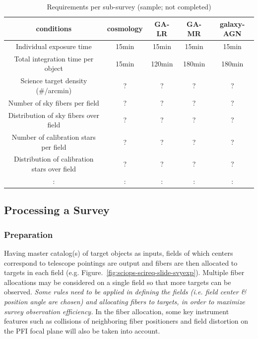 \documentclass[a4paper,notitlepage]{article}
\begin{document}
\begin{table}[htb]
\caption{Requirements per sub-survey (sample; not completed)}
\label{tab:sciops-scireq-subsvy}
\begin{center}
\begin{tabular}{c|c|c|c|c}
conditions & cosmology & GA-LR & GA-MR & galaxy-AGN \\ \hline
\hline
Individual exposure time & 15min & 15min & 15min & 15min \\
\hline
Total integration time per object & 15min & 120min & 180min & 180min \\
\hline
Science target density (\#/arcmin) & ? & ? & ? & ? \\
\hline
Number of sky fibers per field & ? & ? & ? & ? \\
\hline
Distribution of sky fibers over field & ? & ? & ? & ? \\
\hline
Number of calibration stars per field & ? & ? & ? & ? \\
\hline
Distribution of calibration stars over field & ? & ? & ? & ? \\
\hline
 : & : & : & : & : \\
\end{tabular}
\end{center}
\end{table}

\subsection{Processing a Survey}

\subsubsection{Preparation}

Having master catalog(s) of target objects as inputs, fields of which
centers correspond to telescope pointings are output and fibers are then
allocated to targets in each field
(e.g. Figure.~\ref{fig:sciops-scireq-slide-svyexp}). Multiple fiber
allocations may be considered on a single field so that more targets can
be observed. {\it Some rules need to be applied in defining the fields
(i.e. field center \& position angle are chosen) and allocating fibers
to targets, in order to maximize survey observation efficiency.}  In the
fiber allocation, some key instrument features such as collisions of
neighboring fiber positioners and field distortion on the PFI focal
plane will also be taken into account.
\end{document}

